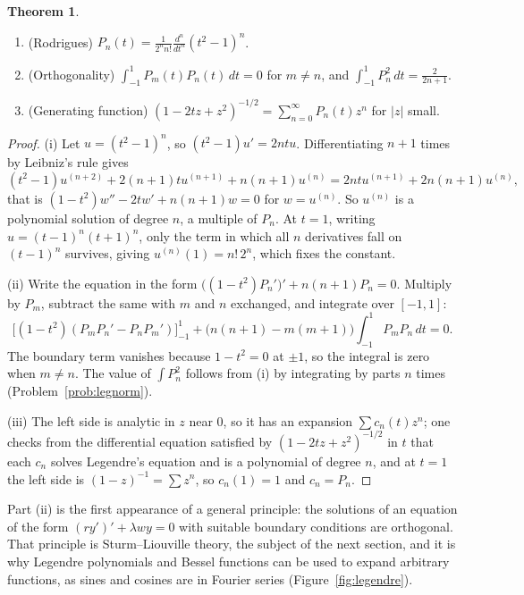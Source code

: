\documentclass[11pt,a4paper]{article}
\numberwithin{equation}{section}
\theoremstyle{definition}
\newtheorem{thm}{Theorem}[subsection]
\begin{document}
\begin{thm}
\label{thm:legendre}
\begin{enumerate}[label=(\roman*)]
\item (Rodrigues) $P_n(t) = \frac{1}{2^nn!}\frac{d^n}{dt^n}(t^2 - 1)^n$.
\item (Orthogonality) $\int_{-1}^1P_m(t)P_n(t)\,dt = 0$ for $m \neq n$, and $\int_{-1}^1P_n^2\,dt = \frac{2}{2n + 1}$.
\item (Generating function) $(1 - 2tz + z^2)^{-1/2} = \sum_{n=0}^\infty P_n(t)z^n$ for $|z|$ small.
\end{enumerate}
\end{thm}

\begin{proof}
(i) Let $u = (t^2 - 1)^n$, so $(t^2 - 1)u' = 2ntu$. Differentiating $n + 1$ times by Leibniz's rule gives
\[
(t^2 - 1)u^{(n+2)} + 2(n + 1)tu^{(n+1)} + n(n + 1)u^{(n)} = 2ntu^{(n+1)} + 2n(n + 1)u^{(n)} ,
\]
that is $(1 - t^2)w'' - 2tw' + n(n + 1)w = 0$ for $w = u^{(n)}$. So $u^{(n)}$ is a polynomial solution of degree $n$, a multiple of $P_n$. At $t = 1$, writing $u = (t - 1)^n(t + 1)^n$, only the term in which all $n$
derivatives fall on $(t - 1)^n$ survives, giving $u^{(n)}(1) = n!\,2^n$, which fixes the constant.

(ii) Write the equation in the form $\bigl((1 - t^2)P_n'\bigr)' + n(n + 1)P_n = 0$. Multiply by $P_m$, subtract the same with $m$ and $n$ exchanged, and integrate over $[-1, 1]$:
\[
\bigl[(1 - t^2)(P_mP_n' - P_nP_m')\bigr]_{-1}^1 + \bigl(n(n + 1) - m(m + 1)\bigr)\int_{-1}^1P_mP_n\,dt = 0 .
\]
The boundary term vanishes because $1 - t^2 = 0$ at $\pm1$, so the integral is zero when $m \neq n$. The value of $\int P_n^2$ follows from (i) by integrating by parts $n$ times (Problem~\ref{prob:legnorm}).

(iii) The left side is analytic in $z$ near $0$, so it has an expansion $\sum c_n(t)z^n$; one checks from the differential equation satisfied by $(1 - 2tz + z^2)^{-1/2}$ in $t$ that each $c_n$ solves Legendre's
equation and is a polynomial of degree $n$, and at $t = 1$ the left side is $(1 - z)^{-1} = \sum z^n$, so $c_n(1) = 1$ and $c_n = P_n$.
\end{proof}

Part (ii) is the first appearance of a general principle: the solutions of an equation of the form $(ry')' + \lambda wy = 0$ with suitable boundary conditions are orthogonal. That principle is
Sturm--Liouville theory, the subject of the next section, and it is why Legendre polynomials and Bessel functions can be used to expand arbitrary functions, as sines and cosines are in
Fourier series (Figure~\ref{fig:legendre}).
\end{document}
